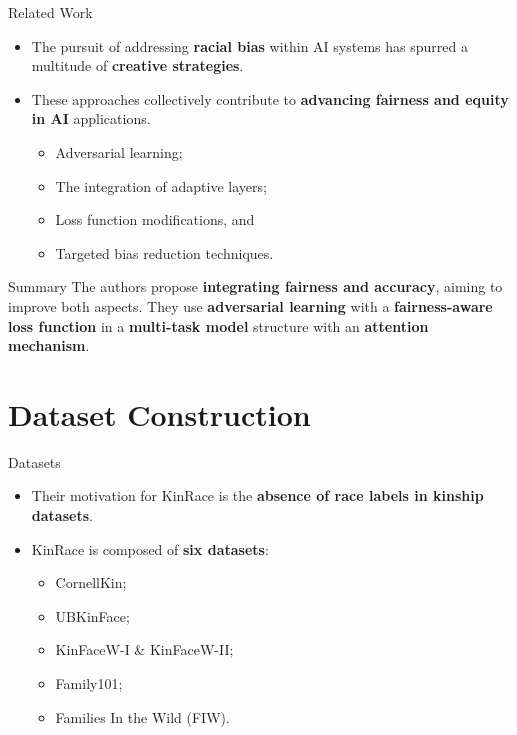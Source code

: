 \documentclass[aspectratio=169,xcolor=dvipsnames]{beamer}
\begin{document}
\begin{frame}{Related Work}
    \begin{itemize}
        \item The pursuit of addressing \textbf{racial bias} within AI systems has spurred a multitude of \textbf{creative strategies}. 
        \item These approaches collectively contribute to \textbf{advancing fairness and equity in AI} applications.
        \begin{itemize}
            \item Adversarial learning;
            \item The integration of adaptive layers; 
            \item Loss function modifications, and
            \item Targeted bias reduction techniques.
        \end{itemize}
    \end{itemize}
    \begin{block}{Summary}
       The authors propose \textbf{integrating fairness and accuracy}, aiming to improve both aspects. They use \textbf{adversarial learning} with a \textbf{fairness-aware loss function} in a \textbf{multi-task model} structure with an \textbf{attention mechanism}. 
    \end{block}
\end{frame}

\section{Dataset Construction}

\begin{frame}{Datasets}
    \begin{itemize}
        \item Their motivation for KinRace is the \textbf{absence of race labels in kinship datasets}. 
        \item KinRace is composed of \textbf{six datasets}:
        \begin{itemize}
            \item CornellKin; 
            \item UBKinFace;
            \item KinFaceW-I \& KinFaceW-II; 
            \item Family101; 
            \item Families In the Wild (FIW).
        \end{itemize}
    \end{itemize}
\end{frame}
\end{document}
